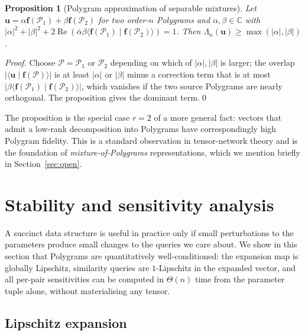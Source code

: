\documentclass[11pt,letterpaper]{article}
\newtheorem{proposition}[theorem]{Proposition}
\theoremstyle{definition}
\newcommand{\C}{\mathbb{C}}
\newcommand{\Polygram}{\mathcal{P}}
\newcommand{\re}{\operatorname{Re}}
\newcommand{\inner}[2]{\langle #1 \mid #2 \rangle}
\newcommand{\abs}[1]{\lvert #1 \rvert}
\begin{document}
\begin{proposition}[Polygram approximation of separable mixtures]
\label{prop:positive-approx}
Let $\bm{u} = \alpha \bm{f}(\Polygram_{1}) + \beta \bm{f}(\Polygram_{2})$ for
two order-$n$ Polygrams and $\alpha, \beta \in \C$ with $\abs{\alpha}^{2} +
\abs{\beta}^{2} + 2\re(\bar\alpha \beta \inner{\bm{f}(\Polygram_{1})}{
\bm{f}(\Polygram_{2})}) = 1$. Then
$\Lambda_{n}(\bm{u}) \geq \max(\abs{\alpha}, \abs{\beta})$.
\end{proposition}

\begin{proof}
Choose $\Polygram = \Polygram_{1}$ or $\Polygram_{2}$ depending on which of
$\abs{\alpha}, \abs{\beta}$ is larger; the overlap $\abs{\inner{\bm{u}}{
\bm{f}(\Polygram)}}$ is at least $\abs{\alpha}$ or $\abs{\beta}$ minus a
correction term that is at most $\abs{\beta \inner{\bm{f}(\Polygram_{1})}{
\bm{f}(\Polygram_{2})}}$, which vanishes if the two source Polygrams are
nearly orthogonal. The proposition gives the dominant term.\qed
\end{proof}

The proposition is the special case $r = 2$ of a more general fact: vectors
that admit a low-rank decomposition into Polygrams have correspondingly high
Polygram fidelity. This is a standard observation in tensor-network theory
and is the foundation of \emph{mixture-of-Polygrams} representations, which
we mention briefly in Section~\ref{sec:open}.

\section{Stability and sensitivity analysis}
\label{sec:stability}

A succinct data structure is useful in practice only if small perturbations to
the parameters produce small changes to the queries we care about. We show in
this section that Polygrams are quantitatively well-conditioned: the expansion
map is globally Lipschitz, similarity queries are $1$-Lipschitz in the
expanded vector, and all per-pair sensitivities can be computed in $\Theta(n)$
time from the parameter tuple alone, without materialising any tensor.

\subsection{Lipschitz expansion}
\end{document}
